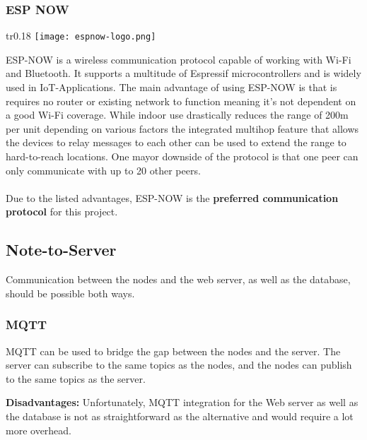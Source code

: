             \subsubsection{ESP NOW} 
            \begin{wrapfigure}[2]{tr}{0.18\textwidth} %
                \vspace{-1cm}
                \hspace{3cm}
                \texttt{[image: espnow-logo.png]}
            \end{wrapfigure}
            ESP-NOW is a wireless communication protocol capable of
            working with Wi-Fi and Bluetooth. It supports a 
            multitude of Espressif microcontrollers and is widely 
            used in IoT-Applications. The main advantage of using
            ESP-NOW is that is requires no router or existing
            network to function meaning it's not dependent on
            a good Wi-Fi coverage. While indoor use drastically
            reduces the range of 200m per unit depending on various
            factors \cite{esp-now-reach_2024} 
            the integrated multihop feature that allows the devices 
            to relay messages to each other can be used to extend 
            the range to hard-to-reach locations. One mayor downside
            of the protocol is that one peer can only communicate with
            up to 20 other peers.
            \\~\\
            Due to the listed advantages, ESP-NOW is the \textbf{preferred
            communication protocol} for this project.

        \subsection{Note-to-Server}
        Communication between the nodes and the web server, as well as the 
        database, should be possible both ways.

            \subsubsection{MQTT}
            MQTT can be used to bridge the gap between the nodes and the server.
            The server can subscribe to the same topics as the nodes, and the nodes
            can publish to the same topics as the server.
        
                \textbf{Disadvantages:}
                Unfortunately, MQTT integration for the Web server as well as the database
                is not as straightforward as the alternative and would require a lot more 
                overhead.
        
